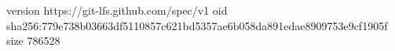 version https://git-lfs.github.com/spec/v1
oid sha256:779e738b03663df5110857c621bd5357ae6b058da891edae8909753e9cf1905f
size 786528
